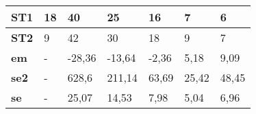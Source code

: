 \begin{table}[]
\begin{tabular}{l|l|lllll|}
\multicolumn{1}{|l|}{\textbf{ST1}}   & 18          & \multicolumn{1}{l|}{40}     & \multicolumn{1}{l|}{25}     & \multicolumn{1}{l|}{16}    & \multicolumn{1}{l|}{7}     & 6     \\ \hline
\multicolumn{1}{|l|}{\textbf{ST2}}   & 9           & \multicolumn{1}{l|}{42}     & \multicolumn{1}{l|}{30}     & \multicolumn{1}{l|}{18}    & \multicolumn{1}{l|}{9}     & 7     \\ \hline
\multicolumn{1}{|l|}{\textbf{em}}    & -           & \multicolumn{1}{l|}{-28,36} & \multicolumn{1}{l|}{-13,64} & \multicolumn{1}{l|}{-2,36} & \multicolumn{1}{l|}{5,18}  & 9,09  \\ \hline
\multicolumn{1}{|l|}{\textbf{se2}}   & -           & \multicolumn{1}{l|}{628,6}  & \multicolumn{1}{l|}{211,14} & \multicolumn{1}{l|}{63,69} & \multicolumn{1}{l|}{25,42} & 48,45 \\ \hline
\multicolumn{1}{|l|}{\textbf{se}}    & -           & \multicolumn{1}{l|}{25,07}  & \multicolumn{1}{l|}{14,53}  & \multicolumn{1}{l|}{7,98}  & \multicolumn{1}{l|}{5,04}  & 6,96  \\ \hline
\end{tabular}
\label{homomorfico}
\end{table}